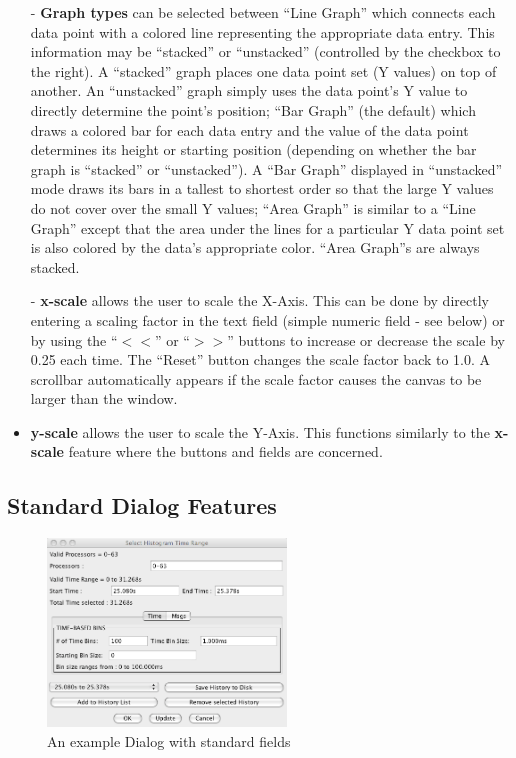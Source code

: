 \documentclass[10pt]{report}
\begin{document}
\begin{itemize}
\item[-] {\bf Graph types} can be selected between ``Line Graph'' which
connects each data point with a colored line representing the
appropriate data entry. This information may be ``stacked'' or
``unstacked'' (controlled by the checkbox to the right). A ``stacked''
graph places one data point set (Y values) on top of another. An
``unstacked'' graph simply uses the data point's Y value to directly
determine the point's position; ``Bar Graph'' (the default) which
draws a colored bar for each data entry and the value of the data
point determines its height or starting position (depending on whether
the bar graph is ``stacked'' or ``unstacked''). A ``Bar Graph''
displayed in ``unstacked'' mode draws its bars in a tallest to
shortest order so that the large Y values do not cover over the small
Y values; ``Area Graph'' is similar to a ``Line Graph'' except that the
area under the lines for a particular Y data point set is also colored
by the data's appropriate color. ``Area Graph''s are always stacked.
\item[-] {\bf x-scale} allows the user to scale the X-Axis. This can be
done by directly entering a scaling factor in the text field (simple
numeric field - see below) or by using the ``$<<$'' or ``$>>$'' buttons
to increase or decrease the scale by 0.25 each time. The ``Reset'' button
changes the scale factor back to 1.0. A scrollbar automatically appears
if the scale factor causes the canvas to be larger than the window.
\item {\bf y-scale} allows the user to scale the Y-Axis. This functions 
similarly to the {\bf x-scale} feature where the buttons and fields are
concerned.
\end{itemize}

\subsection{Standard Dialog Features}

\begin{figure}[htb]
\center
\includegraphics[width=2.5in]{fig/standard_dialog}
\caption{An example Dialog with standard fields}
\label{standard dialog}
\end{figure}
\end{document}
